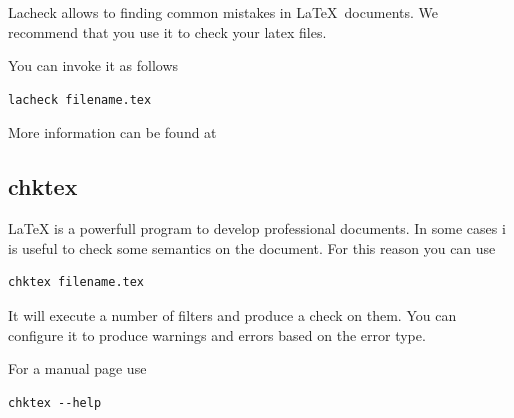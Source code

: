 Lacheck allows to finding common mistakes in \LaTeX~documents. We recommend that you use it to check your latex files.

You can invoke it as follows

\begin{lstlisting}
lacheck filename.tex
\end{lstlisting}

More information can be found at


\subsection{chktex}
\label{s:chktex}

LaTeX is a powerfull program to develop professional documents. In
some cases i is useful to check some semantics on the document. For
this reason you can use 

\begin{lstlisting}
chktex filename.tex
\end{lstlisting}

It will execute a number of filters and produce a check on them. You
can configure it to produce warnings and errors based on the error
type.

For a manual page use

\begin{lstlisting}
chktex --help
\end{lstlisting}

